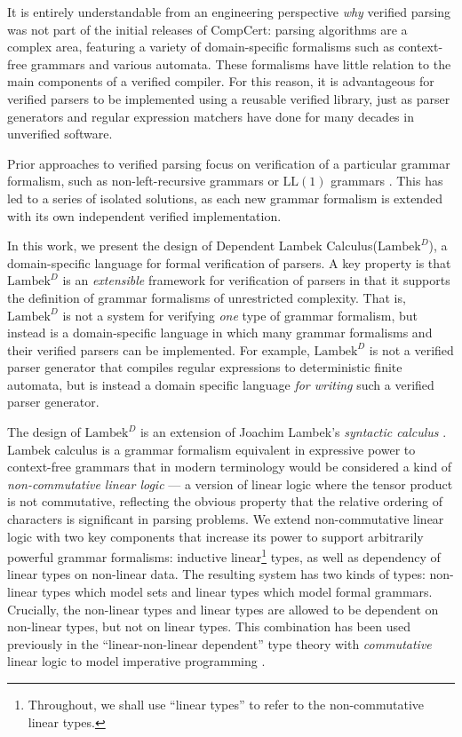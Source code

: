 \documentclass[acmsmall,nonacm]{acmart}
\newcommand{\theoryname}{Dependent Lambek Calculus\xspace}
\newcommand{\theoryabbv}{$\textrm{Lambek}^D$\xspace}
\newcommand{\LLL}{\textrm{LL}}
\newcommand{\LL}[1]{\LLL(#1)}
\begin{document}
It is entirely understandable from an engineering perspective
\emph{why} verified parsing was not part of the initial releases of
CompCert: parsing algorithms are a complex area,
featuring a variety of domain-specific formalisms such as context-free
grammars and various automata. These formalisms have little relation
to the main components of a verified compiler. For this reason, it is
advantageous for verified parsers to be implemented using a reusable
verified library, just as parser generators and regular expression
matchers have done for many decades in unverified software.

Prior approaches to verified parsing focus on verification of a
particular grammar formalism, such as non-left-recursive grammars or
$\LL{1}$ grammars
\cite{lasserCoStarVerifiedALL2021,EdelmannZippy2020,danielssonTotalParserCombinators2010}.
This has led to a series of isolated solutions, as each new grammar formalism is extended with its own independent
verified implementation.

In this work, we present the design of \theoryname (\theoryabbv), a
domain-specific language for formal verification of parsers. A key
property is that \theoryabbv is an \emph{extensible} framework for
verification of parsers in that it supports the definition of grammar
formalisms of unrestricted complexity. That is, \theoryabbv is not a
system for verifying \emph{one} type of grammar formalism, but instead
is a domain-specific language in which many grammar formalisms and
their verified parsers can be implemented. For example, \theoryabbv is
not a verified parser generator that compiles regular expressions to
deterministic finite automata, but is instead a domain specific
language \emph{for writing} such a verified parser generator.

The design of \theoryabbv
is an extension of Joachim Lambek's \emph{syntactic calculus}
\cite{lambek58}. Lambek calculus is a grammar formalism equivalent
in expressive power to context-free grammars that in modern
terminology would be considered a kind of \emph{non-commutative linear
logic} --- a version of linear logic where the tensor product is not
commutative, reflecting the obvious property that the relative
ordering of characters is significant in parsing problems. We extend
non-commutative linear logic with two key components that increase its
power to support arbitrarily powerful grammar formalisms: inductive
linear\footnote{Throughout, we shall use ``linear types'' to refer to the
non-commutative linear types.} types, as well as dependency of linear types on non-linear
data. The resulting system has two kinds of types: non-linear types
which model sets and linear types which model formal
grammars. Crucially, the non-linear types and linear types are allowed
to be dependent on non-linear types, but not on linear types. This
combination has been used previously in the ``linear-non-linear
dependent'' type theory with \emph{commutative} linear logic to model
imperative programming \cite{krishnaswami_integrating_2015}.
\end{document}
